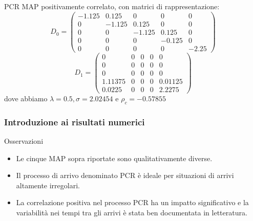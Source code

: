 \documentclass{beamer}
\begin{document}
\begin{frame}
    \frametitle{}
    \begin{block}{PCR}
        MAP positivamente correlato, con matrici di rappresentazione:
        \begin{equation*}
            D_0 =
            \begin{pmatrix}
                -1.125 & 0.125 & 0 & 0 & 0 \\
                0 & -1.125 & 0.125 & 0 & 0 \\
                0 & 0 & -1.125 & 0.125 & 0 \\
                0 & 0 & 0 & -0.125 & 0 \\
                0 & 0 & 0 & 0 & -2.25
            \end{pmatrix}
        \end{equation*}
        \begin{equation*}
            D_1 =
            \begin{pmatrix}
                0 & 0 & 0 & 0 & 0 \\
                0 & 0 & 0 & 0 & 0 \\
                0 & 0 & 0 & 0 & 0 \\
                1.11375 & 0 & 0 & 0 & 0.01125 \\
                0.0225 & 0 & 0 & 0 & 2.2275
            \end{pmatrix}
        \end{equation*}
        dove abbiamo $\lambda = 0.5, \sigma = 2.02454$ e $\rho_c =  -0.57855$
    \end{block}
\end{frame}


\begin{frame}
    \frametitle{Introduzione ai risultati numerici}
    \begin{block}{Osservazioni}
        \begin{itemize}
            \item Le cinque MAP sopra riportate sono qualitativamente diverse.
            \item Il processo di arrivo denominato PCR è ideale per situazioni di arrivi altamente irregolari.
            \item La correlazione positiva nel processo PCR ha un impatto significativo e la variabilità nei tempi tra gli arrivi è stata ben documentata in letteratura.
        \end{itemize}
    \end{block}
\end{frame}
\end{document}
